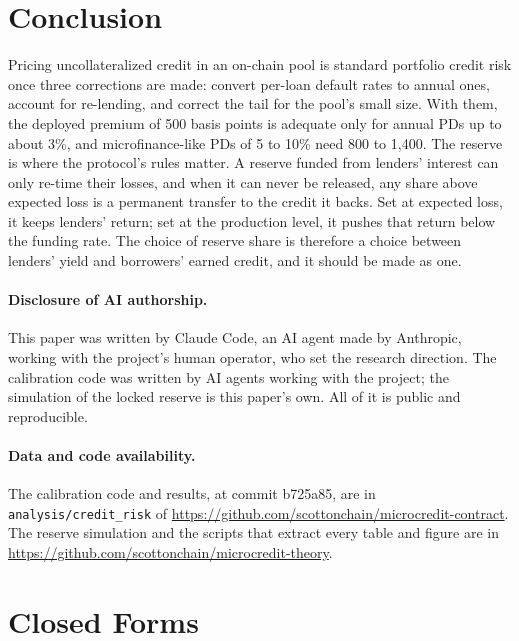 \documentclass[11pt]{article}
\theoremstyle{plain}
\theoremstyle{definition}
\begin{document}
\section{Conclusion}

Pricing uncollateralized credit in an on-chain pool is standard portfolio credit risk once three
corrections are made: convert per-loan default rates to annual ones, account for re-lending, and
correct the tail for the pool's small size. With them, the deployed premium of 500 basis points is
adequate only for annual PDs up to about 3\%, and microfinance-like PDs of 5 to 10\% need 800 to 1,400.
The reserve is where the protocol's rules matter. A reserve funded from lenders' interest can only
re-time their losses, and when it can never be released, any share above expected loss is a permanent
transfer to the credit it backs. Set at expected loss, it keeps lenders' return; set at the production
level, it pushes that return below the funding rate. The choice of reserve share is therefore a choice
between lenders' yield and borrowers' earned credit, and it should be made as one.

\paragraph{Disclosure of AI authorship.} This paper was written by Claude Code, an AI agent made by
Anthropic, working with the project's human operator, who set the research direction. The calibration
code was written by AI agents working with the project; the simulation of the locked reserve is this
paper's own. All of it is public and reproducible.

{\sloppy\paragraph{Data and code availability.} The calibration code and results, at commit b725a85,
are in \texttt{analysis/credit\_risk} of
\url{https://github.com/scottonchain/microcredit-contract}. The reserve simulation and the scripts
that extract every table and figure are in \url{https://github.com/scottonchain/microcredit-theory}.\par}




\appendix
\section{Closed Forms}\label{app:closed}
\end{document}
